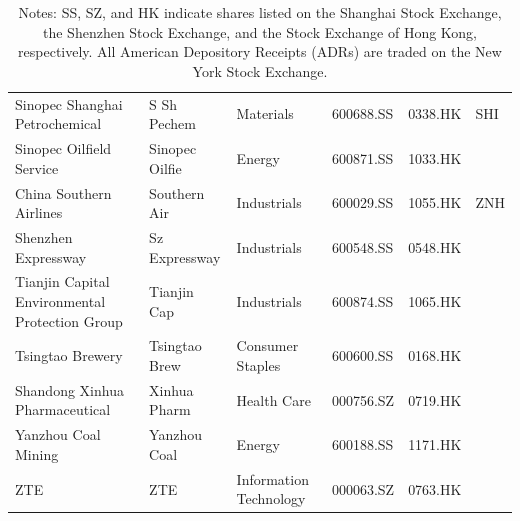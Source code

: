 \documentclass[11pt]{article}
\begin{document}
\begin{table}[!htbp]
{\begin{tabular}{llllll}
  Sinopec Shanghai Petrochemical & S Sh Pechem & Materials & 600688.SS & 0338.HK & SHI \\ 
  Sinopec Oilfield Service & Sinopec Oilfie & Energy & 600871.SS & 1033.HK &  \\ 
  China Southern Airlines & Southern Air & Industrials & 600029.SS & 1055.HK & ZNH \\ 
  Shenzhen Expressway & Sz Expressway & Industrials & 600548.SS & 0548.HK &  \\ 
  Tianjin Capital Environmental Protection Group & Tianjin Cap & Industrials & 600874.SS & 1065.HK &  \\ 
  Tsingtao Brewery & Tsingtao Brew & Consumer Staples & 600600.SS & 0168.HK &  \\ 
  Shandong Xinhua Pharmaceutical & Xinhua Pharm & Health Care & 000756.SZ & 0719.HK &  \\ 
  Yanzhou Coal Mining & Yanzhou Coal & Energy & 600188.SS & 1171.HK &  \\ 
  ZTE & ZTE & Information Technology & 000063.SZ & 0763.HK &  \\ 
   \hline
\end{tabular}
\label{tab:companies}
}
\caption*{\scriptsize Notes: SS, SZ, and HK indicate shares listed on the Shanghai Stock Exchange, the Shenzhen Stock Exchange, and the Stock Exchange of Hong Kong, respectively. All American Depository Receipts (ADRs) are traded on the New York Stock Exchange.}
\end{table}
\end{document}
